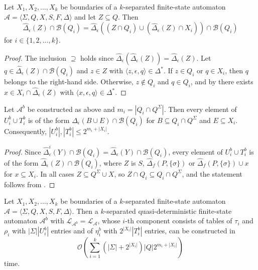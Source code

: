 \begin{proposition}\label{prop:boundary_essential_closure}
  Let $X_1, X_2, \ldots, X_k$ be boundaries of a $k$-separated finite-state automaton
  $\mathcal{A} = \langle \Sigma, Q, X, S, F, \Delta \rangle$ and let $Z \subseteq Q$. Then
  \begin{equation*}
    \hat{\Delta}_\epsilon(Z) \cap \mathcal{B}(Q_i) = \hat{\Delta}_\epsilon((Z \cap Q_i) \cup
    (\hat{\Delta}_\epsilon(Z) \cap X_i)) \cap \mathcal{B}(Q_i)
  \end{equation*}
  for $i \in \{ 1, 2, \ldots, k \}$.
\end{proposition}

\begin{proof}
  The inclusion $\supseteq$ holds since $\hat{\Delta}_\epsilon(\hat{\Delta}_\epsilon(Z)) =
  \hat{\Delta}_\epsilon(Z)$. Let $q \in \hat{\Delta}_\epsilon(Z) \cap \mathcal{B}(Q_i)$ and
  $z \in Z$ with $\langle z, \epsilon, q \rangle \in \Delta^*$. If $z \in Q_i$ or $q \in X_i$,
  then $q$ belongs to the right-hand side. Otherwise, $z \not\in Q_i$ and $q \in Q_i$, and by
   there exists $x \in X_i \cap \hat{\Delta}_\epsilon(Z)$ with
  $\langle x, \epsilon, q \rangle \in \Delta^*$.
\end{proof}

\begin{lemma}\label{lem:boundary_essential}
  Let $\mathcal{A}^b$ be constructed as above and $m_i = |Q_i \cap Q^\Sigma|$. Then every
  element of $U_i^b \cup T_i^b$ is of the form $\hat{\Delta}_\epsilon(B \cup E) \cap
  \mathcal{B}(Q_i)$ for $B \subseteq Q_i \cap Q^\Sigma$ and $E \subseteq X_i$. Consequently,
  $|U_i^b|, |T_i^b| \leq 2^{m_i + |X_i|}$.
\end{lemma}

\begin{proof}
  Since $\hat{\Delta}_\epsilon^i(Y) \cap \mathcal{B}(Q_i) = \hat{\Delta}_\epsilon(Y) \cap
  \mathcal{B}(Q_i)$, every element of $U_i^b \cup T_i^b$ is of the form
  $\hat{\Delta}_\epsilon(Z) \cap \mathcal{B}(Q_i)$, where $Z$ is $S$,
  $\hat{\Delta}_f(P, \{ \sigma \})$ or $\hat{\Delta}_f(P, \{ \sigma \}) \cup x$ for $x
  \subseteq X_i$. In all cases $Z \subseteq Q^\Sigma \cup X$, so $Z \cap Q_i \subseteq Q_i
  \cap Q^\Sigma$, and the statement follows from .
\end{proof}

\begin{theorem}\label{thm:quasidet_boundaries}
  Let $X_1, X_2, \ldots, X_k$ be boundaries of a $k$-separated finite-state automaton
  $\mathcal{A} = \langle \Sigma, Q, X, S, F, \Delta \rangle$. Then a $k$-separated
  quasi-deterministic finite-state automaton $\mathcal{A}^b$ with $\mathcal{L}_{\mathcal{A}^b}
  = \mathcal{L}_\mathcal{A}$, whose $i$-th component consists of tables of $\tau_i$ and
  $\rho_i$ with $|\Sigma| |U_i^b|$ entries and of $\eta_i^b$ with $2^{|X_i|} |T_i^b|$ entries,
  can be constructed in
  \begin{equation*}
    \mathcal{O}(\sum_{i=1}^k (|\Sigma| + 2^{|X_i|}) |Q| 2^{m_i + |X_i|})
  \end{equation*}
  time.
\end{theorem}

